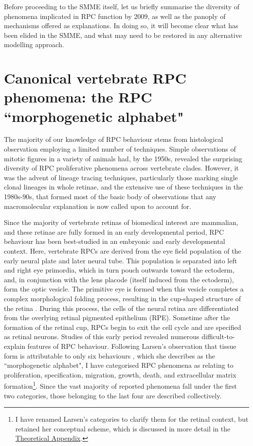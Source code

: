 Before proceeding to the SMME itself, let us briefly summarise the diversity of phenomena implicated in RPC function by 2009, as well as the panoply of mechanisms offered as explanations. In doing so, it will become clear what has been elided in the SMME, and what may need to be restored in any alternative modelling approach.

\section{Canonical vertebrate RPC phenomena: the RPC ``morphogenetic alphabet"}

The majority of our knowledge of RPC behaviour stems from histological observation employing a limited number of techniques. Simple observations of mitotic figures in a variety of animals had, by the 1950s, revealed the surprising diversity of RPC proliferative phenomena across vertebrate clades. However, it was the advent of lineage tracing techniques, particularly those marking single clonal lineages in whole retinae, and the extensive use of these techniques in the 1980s-90s, that formed most of the basic body of observations that any macromolecular explanation is now called upon to account for.

Since the majority of vertebrate retinas of biomedical interest are mammalian, and these retinae are fully formed in an early developmental period, RPC behaviour has been best-studied in an embryonic and early developmental context. Here, vertebrate RPCs are derived from the eye field population of the early neural plate and later neural tube. This population is separated into left and right eye primordia, which in turn pouch outwards toward the ectoderm, and, in conjunction with the lens placode (itself induced from the ectoderm), form the optic vesicle. The primitive eye is formed when this vesicle completes a complex morphological folding process, resulting in the cup-shaped structure of the retina \cite{Cavodeassi2018}. During this process, the cells of the neural retina are differentiated from the overlying retinal pigmented epithelium (RPE). Sometime after the formation of the retinal cup, RPCs begin to exit the cell cycle and are specified as retinal neurons. Studies of this early period revealed numerous difficult-to-explain features of RPC behaviour. Following Larsen's observation that tissue form is attributable to only six behaviours \cite{Larsen1992}, which she describes as the ``morphogenetic alphabet", I have categorised RPC phenomena as relating to proliferation, specification, migration, growth, death, and extracellular matrix formation\footnote{I have renamed Larsen's categories to clarify them for the retinal context, but retained her conceptual scheme, which is discussed in more detail in the \hyperref[alphabet]{Theoretical Appendix}.}. Since the vast majority of reported phenomena fall under the first two categories, those belonging to the last four are described collectively.

